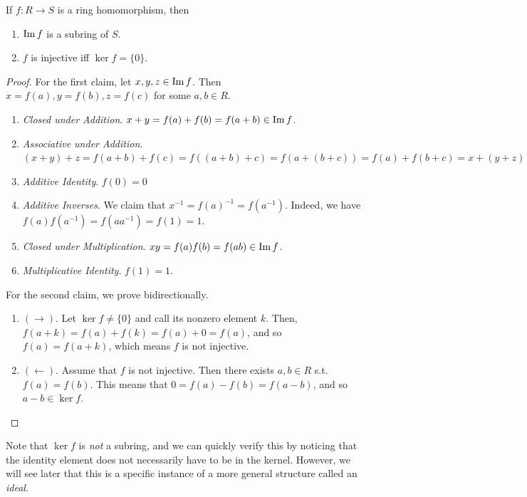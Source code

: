   \begin{lemma}
    If $f: R \rightarrow S$ is a ring homomorphism, then 
    \begin{enumerate}
      \item $\operatorname{Im}{f}$ is a subring of $S$. 
      \item $f$ is injective iff $\ker{f} = \{0\}$. 
    \end{enumerate}
  \end{lemma}
  \begin{proof}
    For the first claim, let $x, y, z \in \operatorname{Im}{f}$. Then $x = f(a), y = f(b), z = f(c)$ for some $a, b \in R$. 
    \begin{enumerate}
      \item \textit{Closed under Addition}. $x + y = f(a) + f(b) = f(a + b) \in \operatorname{Im}{f}$. 
      \item \textit{Associative under Addition}. $(x + y) + z = f(a + b) + f(c) = f((a + b) + c) = f(a + (b + c)) = f(a) + f(b + c) = x + (y + z)$
      \item \textit{Additive Identity}. $f(0) = 0$
      \item \textit{Additive Inverses}. We claim that $x^{-1} = f(a)^{-1} = f(a^{-1})$. Indeed, we have $f(a) f(a^{-1}) = f(a a^{-1}) = f(1) = 1$. 
      \item \textit{Closed under Multiplication}. $xy = f(a) f(b) = f(ab) \in \operatorname{Im}{f}$. 
      \item \textit{Multiplicative Identity}. $f(1) = 1$. 
    \end{enumerate}
    For the second claim, we prove bidirectionally. 
    \begin{enumerate}
      \item $(\rightarrow)$. Let $\ker{f} \neq \{0\}$ and call its nonzero element $k$. Then, $f(a + k) = f(a) + f(k) = f(a) + 0 = f(a)$, and so $f(a) = f(a + k)$, which means $f$ is not injective. 
      \item $(\leftarrow)$. Assume that $f$ is not injective. Then there exists $a, b \in R$ s.t. $f(a) = f(b)$. This means that $0 = f(a) - f(b) = f(a - b)$, and so $a - b \in \ker{f}$. 
    \end{enumerate}
  \end{proof}

  Note that $\ker{f}$ is \textit{not} a subring, and we can quickly verify this by noticing that the identity element does not necessarily have to be in the kernel. However, we will see later that this is a specific instance of a more general structure called an \textit{ideal}. 

